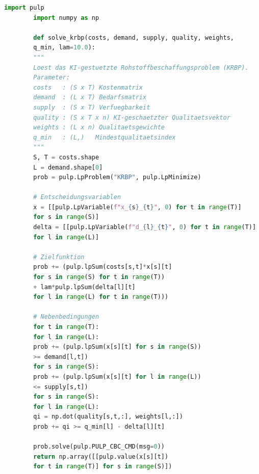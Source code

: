 ﻿\documentclass[12pt,a4paper]{article}
\theoremstyle{plain}
\theoremstyle{definition}
\begin{document}
	\begin{lstlisting}[language=Python, caption={Vereinfachter Python-Wrapper
			für den KRBP-MILP-Solver unter Verwendung von PuLP}]
		import pulp
		import numpy as np
		
		def solve_krbp(costs, demand, supply, quality, weights,
		q_min, lam=10.0):
		"""
		Loest das KI-gestuetzte Rohstoffbeschaffungsproblem (KRBP).
		Parameter:
		costs   : (S x T) Kostenmatrix
		demand  : (L x T) Bedarfsmatrix
		supply  : (S x T) Verfuegbarkeit
		quality : (S x T x n) KI-geschaetzter Qualitaetsvektor
		weights : (L x n) Qualitaetsgewichte
		q_min   : (L,)   Mindestqualitaetsindex
		"""
		S, T = costs.shape
		L = demand.shape[0]
		prob = pulp.LpProblem("KRBP", pulp.LpMinimize)
		
		# Entscheidungsvariablen
		x = [[pulp.LpVariable(f"x_{s}_{t}", 0) for t in range(T)]
		for s in range(S)]
		delta = [[pulp.LpVariable(f"d_{l}_{t}", 0) for t in range(T)]
		for l in range(L)]
		
		# Zielfunktion
		prob += (pulp.lpSum(costs[s,t]*x[s][t]
		for s in range(S) for t in range(T))
		+ lam*pulp.lpSum(delta[l][t]
		for l in range(L) for t in range(T)))
		
		# Nebenbedingungen
		for t in range(T):
		for l in range(L):
		prob += (pulp.lpSum(x[s][t] for s in range(S))
		>= demand[l,t])
		for s in range(S):
		prob += (pulp.lpSum(x[s][t] for l in range(L))
		<= supply[s,t])
		for s in range(S):
		for l in range(L):
		qi = np.dot(quality[s,t,:], weights[l,:])
		prob += qi >= q_min[l] - delta[l][t]
		
		prob.solve(pulp.PULP_CBC_CMD(msg=0))
		return np.array([[pulp.value(x[s][t])
		for t in range(T)] for s in range(S)])
	\end{lstlisting}
	
\end{document}
